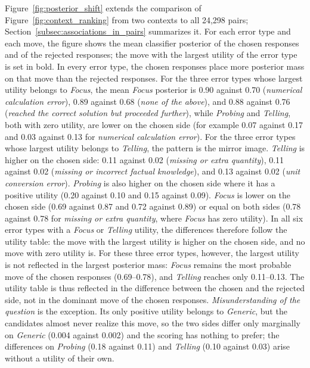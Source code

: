 Figure~\ref{fig:posterior_shift} extends the comparison of Figure~\ref{fig:context_ranking} from two contexts to all 24,298 pairs; Section~\ref{subsec:associations_in_pairs} summarizes it. For each error type and each move, the figure shows the mean classifier posterior of the chosen responses and of the rejected responses; the move with the largest utility of the error type is set in bold. In every error type, the chosen responses place more posterior mass on that move than the rejected responses. For the three error types whose largest utility belongs to \textit{Focus}, the mean \textit{Focus} posterior is 0.90 against 0.70 (\textit{numerical calculation error}), 0.89 against 0.68 (\textit{none of the above}), and 0.88 against 0.76 (\textit{reached the correct solution but proceeded further}), while \textit{Probing} and \textit{Telling}, both with zero utility, are lower on the chosen side (for example 0.07 against 0.17 and 0.03 against 0.13 for \textit{numerical calculation error}). For the three error types whose largest utility belongs to \textit{Telling}, the pattern is the mirror image. \textit{Telling} is higher on the chosen side: 0.11 against 0.02 (\textit{missing or extra quantity}), 0.11 against 0.02 (\textit{missing or incorrect factual knowledge}), and 0.13 against 0.02 (\textit{unit conversion error}). \textit{Probing} is also higher on the chosen side where it has a positive utility (0.20 against 0.10 and 0.15 against 0.09). \textit{Focus} is lower on the chosen side (0.69 against 0.87 and 0.72 against 0.89) or equal on both sides (0.78 against 0.78 for \textit{missing or extra quantity}, where \textit{Focus} has zero utility). In all six error types with a \textit{Focus} or \textit{Telling} utility, the differences therefore follow the utility table: the move with the largest utility is higher on the chosen side, and no move with zero utility is. For these three error types, however, the largest utility is not reflected in the largest posterior mass: \textit{Focus} remains the most probable move of the chosen responses (0.69--0.78), and \textit{Telling} reaches only 0.11--0.13. The utility table is thus reflected in the difference between the chosen and the rejected side, not in the dominant move of the chosen responses. \textit{Misunderstanding of the question} is the exception. Its only positive utility belongs to \textit{Generic}, but the candidates almost never realize this move, so the two sides differ only marginally on \textit{Generic} (0.004 against 0.002) and the scoring has nothing to prefer; the differences on \textit{Probing} (0.18 against 0.11) and \textit{Telling} (0.10 against 0.03) arise without a utility of their own.

